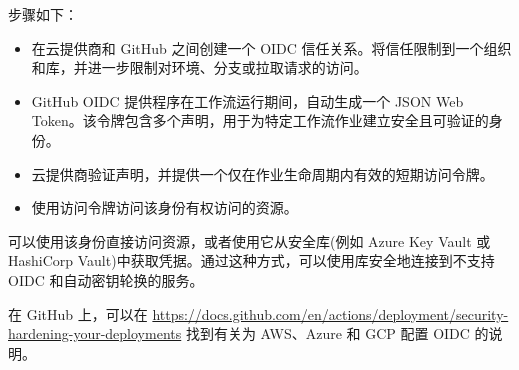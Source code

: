 
步骤如下：

\begin{itemize}
\item 
在云提供商和 GitHub 之间创建一个 OIDC 信任关系。将信任限制到一个组织和库，并进一步限制对环境、分支或拉取请求的访问。

\item 
GitHub OIDC 提供程序在工作流运行期间，自动生成一个 JSON Web Token。该令牌包含多个声明，用于为特定工作流作业建立安全且可验证的身份。

\item 
云提供商验证声明，并提供一个仅在作业生命周期内有效的短期访问令牌。

\item 
使用访问令牌访问该身份有权访问的资源。
\end{itemize}

可以使用该身份直接访问资源，或者使用它从安全库(例如 Azure Key Vault 或 HashiCorp Vault)中获取凭据。通过这种方式，可以使用库安全地连接到不支持 OIDC 和自动密钥轮换的服务。

在 GitHub 上，可以在 \url{https://docs.github.com/en/actions/deployment/security-hardening-your-deployments} 找到有关为 AWS、Azure 和 GCP 配置 OIDC 的说明。
